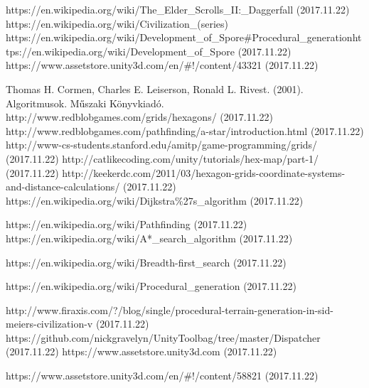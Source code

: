 \begin{thebibliography}{x}

 https://en.wikipedia.org/wiki/The\_Elder\_Scrolls\_II:\_Daggerfall (2017.11.22)
 https://en.wikipedia.org/wiki/Civilization\_(series)
 https://en.wikipedia.org/wiki/Development\_of\_Spore\#Procedural\_generationhttps://en.wikipedia.org/wiki/Development\_of\_Spore (2017.11.22)
 https://www.assetstore.unity3d.com/en/\#!/content/43321 (2017.11.22)










 Thomas H. Cormen, Charles E. Leiserson, Ronald L. Rivest. (2001). Algoritmusok. Műszaki Könyvkiadó.
 http://www.redblobgames.com/grids/hexagons/ (2017.11.22)
 http://www.redblobgames.com/pathfinding/a-star/introduction.html (2017.11.22)
 http://www-cs-students.stanford.edu/$\tilde{}$amitp/game-programming/grids/ (2017.11.22)
 http://catlikecoding.com/unity/tutorials/hex-map/part-1/ (2017.11.22)
 http://keekerdc.com/2011/03/hexagon-grids-coordinate-systems-and-distance-calculations/ (2017.11.22)
 https://en.wikipedia.org/wiki/Dijkstra\%27s\_algorithm (2017.11.22)







 https://en.wikipedia.org/wiki/Pathfinding (2017.11.22)
 https://en.wikipedia.org/wiki/A*\_search\_algorithm (2017.11.22)

 https://en.wikipedia.org/wiki/Breadth-first\_search (2017.11.22)

 https://en.wikipedia.org/wiki/Procedural\_generation (2017.11.22)




 http://www.firaxis.com/?/blog/single/procedural-terrain-generation-in-sid-meiers-civilization-v (2017.11.22)
 https://github.com/nickgravelyn/UnityToolbag/tree/master/Dispatcher (2017.11.22)
 https://www.assetstore.unity3d.com (2017.11.22)

 https://www.assetstore.unity3d.com/en/\#!/content/58821 (2017.11.22)


\end{thebibliography}
